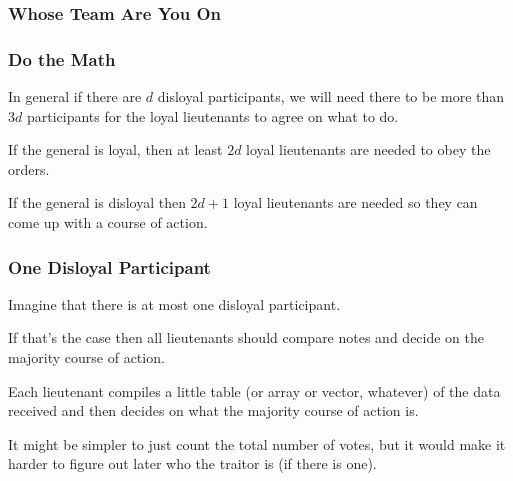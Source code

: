 \begin{frame}
	\frametitle{Whose Team Are You On}

	\begin{center}
	\end{center}

\end{frame}

\begin{frame}
	\frametitle{Do the Math}

	In general if there are $d$ disloyal participants, we will need there to be more than $3d$ participants for the loyal lieutenants to agree on what to do.

	If the general is loyal, then at least $2d$ loyal lieutenants are needed to obey the orders.

	If the general is disloyal then $2d+1$ loyal lieutenants are needed so they can come up with a course of action.

\end{frame}


\begin{frame}
	\frametitle{One Disloyal Participant}

	Imagine that there is at most one disloyal participant.

	If that's the case then all lieutenants should compare notes and decide on the majority course of action.

	Each lieutenant compiles a little table (or array or vector, whatever) of the data received and then decides on what the majority course of action is.

	It might be simpler to just count the total number of votes, but it would make it harder to figure out later who the traitor is (if there is one).

\end{frame}


